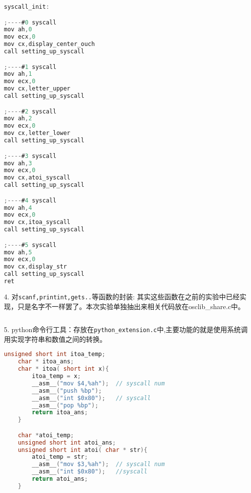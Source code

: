 \documentclass[a4paper]{article}
\begin{document}
{{{{\scriptsize
	\begin{lstlisting}[language={C}]
syscall_init:

;----#0 syscall
mov ah,0
mov ecx,0
mov cx,display_center_ouch
call setting_up_syscall

;----#1 syscall
mov ah,1
mov ecx,0
mov cx,letter_upper
call setting_up_syscall

;----#2 syscall
mov ah,2
mov ecx,0
mov cx,letter_lower
call setting_up_syscall

;----#3 syscall
mov ah,3
mov ecx,0
mov cx,atoi_syscall
call setting_up_syscall

;----#4 syscall
mov ah,4
mov ecx,0
mov cx,itoa_syscall
call setting_up_syscall

;----#5 syscall
mov ah,5
mov ecx,0
mov cx,display_str
call setting_up_syscall
ret
	\end{lstlisting}}
	4. 对\verb|scanf,printint,gets..|等函数的封装:
	其实这些函数在之前的实验中已经实现，只是名字不一样罢了。本次实验单独抽出来相关代码放在osclib\_share.c中。
	{\scriptsize
	\begin{lstlisting}[language={C}]
	\end{lstlisting}}
	5. python命令行工具：存放在\verb|python_extension.c|中,主要功能的就是使用系统调用实现字符串和数值之间的转换。
	\begin{lstlisting}[language={C}]
	unsigned short int itoa_temp;
	char * itoa_ans;
	char * itoa( short int x){
		itoa_temp = x;
		__asm__("mov $4,%ah");  // syscall num
		__asm__("push %bp");
		__asm__("int $0x80");	// syscall
		__asm__("pop %bp");
		return itoa_ans;
	}

	char *atoi_temp;
	unsigned short int atoi_ans;
	unsigned short int atoi( char * str){
		atoi_temp = str;
		__asm__("mov $3,%ah");  // syscall num
		__asm__("int $0x80");	//syscall
		return atoi_ans;
	}
	\end{lstlisting}
}

}}
\end{document}
